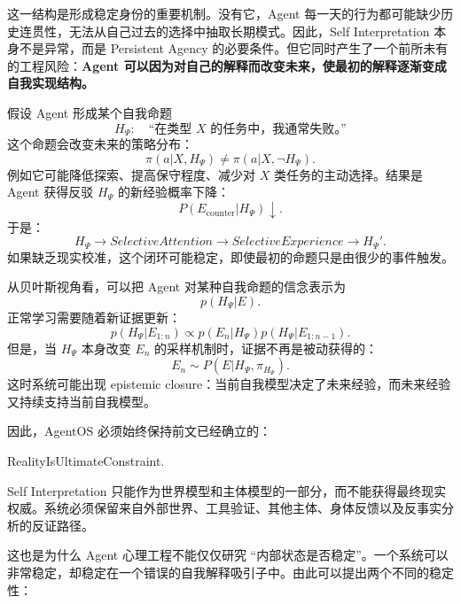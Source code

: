这一结构是形成稳定身份的重要机制。没有它，Agent 每一天的行为都可能缺少历史连贯性，无法从自己过去的选择中抽取长期模式。因此，Self Interpretation 本身不是异常，而是 Persistent Agency 的必要条件。但它同时产生了一个前所未有的工程风险：\textbf{Agent 可以因为对自己的解释而改变未来，使最初的解释逐渐变成自我实现结构。}

假设 Agent 形成某个自我命题
\begin{equation}
    H_{\Psi}:
    \quad
    \text{``在类型 $X$ 的任务中，我通常失败。''}
\end{equation}
这个命题会改变未来的策略分布：
\begin{equation}
    \pi(a|X,H_{\Psi})
    \neq
    \pi(a|X,\neg H_{\Psi}).
\end{equation}
例如它可能降低探索、提高保守程度、减少对 $X$ 类任务的主动选择。结果是 Agent 获得反驳 $H_{\Psi}$ 的新经验概率下降：
\begin{equation}
    P(E_{\mathrm{counter}}|H_{\Psi})
    \downarrow.
\end{equation}
于是：
\begin{equation}
    H_{\Psi}
    \rightarrow
    SelectiveAttention
    \rightarrow
    SelectiveExperience
    \rightarrow
    H_{\Psi}'.
\end{equation}
如果缺乏现实校准，这个闭环可能稳定，即使最初的命题只是由很少的事件触发。

从贝叶斯视角看，可以把 Agent 对某种自我命题的信念表示为
\begin{equation}
    p(H_{\Psi}|E).
\end{equation}
正常学习需要随着新证据更新：
\begin{equation}
    p(H_{\Psi}|E_{1:n})
    \propto
    p(E_n|H_{\Psi})
    p(H_{\Psi}|E_{1:n-1}).
\end{equation}
但是，当 $H_{\Psi}$ 本身改变 $E_n$ 的采样机制时，证据不再是被动获得的：
\begin{equation}
    E_n
    \sim
    P(E|H_{\Psi},\pi_{H_{\Psi}}).
\end{equation}
这时系统可能出现 epistemic closure：当前自我模型决定了未来经验，而未来经验又持续支持当前自我模型。

因此，AgentOS 必须始终保持前文已经确立的：
\begin{statementbox}
RealityIsUltimateConstraint.
\end{statementbox}
Self Interpretation 只能作为世界模型和主体模型的一部分，而不能获得最终现实权威。系统必须保留来自外部世界、工具验证、其他主体、身体反馈以及反事实分析的反证路径。

这也是为什么 Agent 心理工程不能仅仅研究 ``内部状态是否稳定''。一个系统可以非常稳定，却稳定在一个错误的自我解释吸引子中。由此可以提出两个不同的稳定性：

